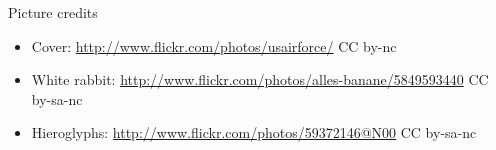 \begin{frame}[plain]{Picture credits}
  \scriptsize
  \begin{itemize}
    \item Cover: \url{http://www.flickr.com/photos/usairforce/} CC by-nc
    \item White rabbit: \url{http://www.flickr.com/photos/alles-banane/5849593440} CC by-sa-nc
    \item Hieroglyphs: \url{http://www.flickr.com/photos/59372146@N00} CC by-sa-nc

  \end{itemize}
\end{frame}


